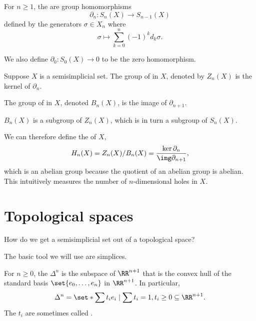 \documentclass{standalone}
\begin{document}
\begin{definition}
  For \(n \geq 1\), the  are group homomorphisms
  \[
    \partial_n \colon S_n(X) \to S_{n - 1}(X)
  \]
  defined by the generators \(\sigma \in X_n\) where
  \[
    \sigma \mapsto \sum_{k = 0}^{n} (-1)^k d_k \sigma.
  \]

  We also define \(\partial_0 \colon S_0(X) \to 0\) to be
  the zero homomorphism.
\end{definition}

\begin{definition}
  Suppose \(X\) is a semisimplicial set. The group of 
  in \(X\), denoted by \(Z_n(X)\) is the kernel of \(\partial_n\).
  
  The group of  in \(X\), denoted \(B_n(X)\),
  is the image of \(\partial_{n+1}\).
\end{definition}

\begin{exercise}[On homework]
  \(B_n(X)\) is a subgroup of \(Z_n(X)\), which is in turn
  a subgroup of \(S_n(X)\).
\end{exercise}

We can therefore define the  of \(X\),
\[
  H_n(X) = Z_n(X) / B_n(X) = \frac{\ker \partial_n}{\img \partial_{n+1}},
\]
which is an abelian group because the quotient of an abelian group is abelian.
This intuitively measures the number of \(n\)-dimensional holes in \(X\).

\section{Topological spaces}
\begin{question}
  How do we get a semisimplicial set out of a topological space?
\end{question}

The basic tool we will use are simplices.
\begin{definition}
  For \(n \geq 0\), the  \(\Delta^n\) is
  the subspace of \(\RR^{n+1}\) that is the convex hull of the standard basis
  \(\set{e_0, \dots, e_n}\) in \(\RR^{n+1}\). In particular,
  \[
    \Delta^n = \set*{\sum t_i e_i \mid \sum t_i = 1, t_i \geq 0}
      \subseteq \RR^{n+1}.
  \]
  The \(t_i\) are sometimes called .
\end{definition}
\end{document}
